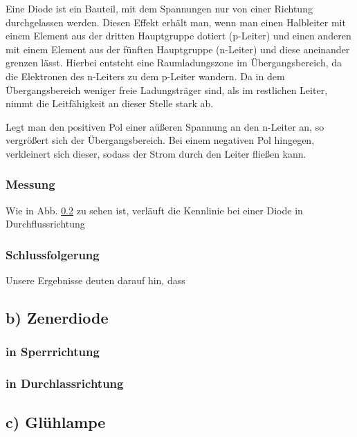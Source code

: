 \documentclass[11pt,a4paper,titlepage, ngerman]{article}
\begin{document}
				Eine Diode ist ein Bauteil, mit dem Spannungen nur von einer Richtung durchgelassen werden. Diesen Effekt erhält man, wenn man einen Halbleiter mit einem Element aus der dritten Hauptgruppe dotiert (p-Leiter) und einen anderen mit einem Element aus der fünften Hauptgruppe (n-Leiter) und diese aneinander grenzen lässt. Hierbei entsteht eine Raumladungszone im Übergangsbereich, da die Elektronen des n-Leiters zu dem p-Leiter wandern. Da in dem Übergangsbereich weniger freie Ladungsträger sind, als im restlichen Leiter, nimmt die Leitfähigkeit an dieser Stelle stark ab.
				
				Legt man den positiven Pol einer aüßeren Spannung an den n-Leiter an, so vergrößert sich der Übergangsbereich. Bei einem negativen Pol hingegen, verkleinert sich dieser, sodass der Strom durch den Leiter fließen kann. 
			
			\subsubsection{Messung}
				
				Wie in Abb. \ref{} zu sehen ist, verläuft die Kennlinie bei einer Diode in Durchflussrichtung %
			
			\subsubsection{Schlussfolgerung}
			
				Unsere Ergebnisse deuten darauf hin, dass %
				
		\subsection{b) Zenerdiode} %
		
			\subsubsection{in Sperrrichtung}
			
			\subsubsection{in Durchlassrichtung}
			
		\subsection{c) Glühlampe} %
\end{document}
